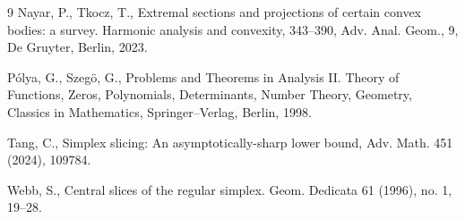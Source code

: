 \documentclass[10pt]{amsart}
\newcommand{\1}{\textbf{1}}
\theoremstyle{remark}
\theoremstyle{definition}
\begin{document}
\begin{thebibliography}{9}
Nayar, P., Tkocz, T., Extremal sections and projections of certain convex bodies: a survey. Harmonic analysis and convexity, 343--390, Adv. Anal. Geom., 9, De Gruyter, Berlin, 2023.


P\'olya, G., Szeg\"o, G., Problems and Theorems in Analysis II. Theory of Functions, Zeros, Polynomials, Determinants, Number Theory, Geometry, Classics in Mathematics, Springer--Verlag, Berlin, 1998.


Tang, C., 
Simplex slicing: An asymptotically-sharp lower bound,
Adv. Math. 451 (2024), 109784.




Webb, S., Central slices of the regular simplex. Geom. Dedicata 61 (1996), no. 1, 19--28.


\end{thebibliography}
\end{document}
